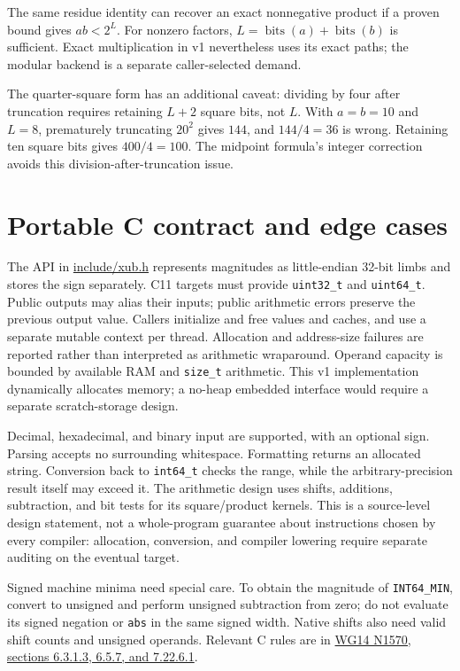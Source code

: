 \documentclass[11pt,a4paper]{article}
\begin{document}
The same residue identity can recover an exact nonnegative product if a proven bound gives $ab<2^L$. For nonzero factors, $L=\operatorname{bits}(a)+\operatorname{bits}(b)$ is sufficient. Exact multiplication in v1 nevertheless uses its exact paths; the modular backend is a separate caller-selected demand.

The quarter-square form has an additional caveat: dividing by four after truncation requires retaining $L+2$ square bits, not $L$. With $a=b=10$ and $L=8$, prematurely truncating $20^2$ gives $144$, and $144/4=36$ is wrong. Retaining ten square bits gives $400/4=100$. The midpoint formula's integer correction avoids this division-after-truncation issue.

\section{Portable C contract and edge cases}

The API in \href{\detokenize{include/xub.h}}{include/xub.h} represents magnitudes as little-endian 32-bit limbs and stores the sign separately. C11 targets must provide \texttt{uint32\_t} and \texttt{uint64\_t}. Public outputs may alias their inputs; public arithmetic errors preserve the previous output value. Callers initialize and free values and caches, and use a separate mutable context per thread. Allocation and address-size failures are reported rather than interpreted as arithmetic wraparound. Operand capacity is bounded by available RAM and \texttt{size\_t} arithmetic. This v1 implementation dynamically allocates memory; a no-heap embedded interface would require a separate scratch-storage design.

Decimal, hexadecimal, and binary input are supported, with an optional sign. Parsing accepts no surrounding whitespace. Formatting returns an allocated string. Conversion back to \texttt{int64\_t} checks the range, while the arbitrary-precision result itself may exceed it. The arithmetic design uses shifts, additions, subtraction, and bit tests for its square/product kernels. This is a source-level design statement, not a whole-program guarantee about instructions chosen by every compiler: allocation, conversion, and compiler lowering require separate auditing on the eventual target.

Signed machine minima need special care. To obtain the magnitude of \texttt{INT64\_MIN}, convert to unsigned and perform unsigned subtraction from zero; do not evaluate its signed negation or \texttt{abs} in the same signed width. Native shifts also need valid shift counts and unsigned operands. Relevant C rules are in \href{\detokenize{https://www.open-std.org/jtc1/sc22/wg14/www/docs/n1570.pdf}}{WG14 N1570, sections 6.3.1.3, 6.5.7, and 7.22.6.1}.
\end{document}
